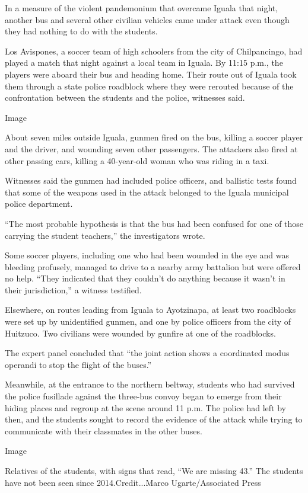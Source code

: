 In a measure of the violent pandemonium that overcame Iguala that night,
another bus and several other civilian vehicles came under attack even
though they had nothing to do with the students.

Los Avispones, a soccer team of high schoolers from the city of
Chilpancingo, had played a match that night against a local team in
Iguala. By 11:15 p.m., the players were aboard their bus and heading
home. Their route out of Iguala took them through a state police
roadblock where they were rerouted because of the confrontation between
the students and the police, witnesses said.

Image

About seven miles outside Iguala, gunmen fired on the bus, killing a
soccer player and the driver, and wounding seven other passengers. The
attackers also fired at other passing cars, killing a 40-year-old woman
who was riding in a taxi.

Witnesses said the gunmen had included police officers, and ballistic
tests found that some of the weapons used in the attack belonged to the
Iguala municipal police department.

``The most probable hypothesis is that the bus had been confused for one
of those carrying the student teachers,'' the investigators wrote.

Some soccer players, including one who had been wounded in the eye and
was bleeding profusely, managed to drive to a nearby army battalion but
were offered no help. ``They indicated that they couldn't do anything
because it wasn't in their jurisdiction,'' a witness testified.

Elsewhere, on routes leading from Iguala to Ayotzinapa, at least two
roadblocks were set up by unidentified gunmen, and one by police
officers from the city of Huitzuco. Two civilians were wounded by
gunfire at one of the roadblocks.

The expert panel concluded that ``the joint action shows a coordinated
modus operandi to stop the flight of the buses.''

Meanwhile, at the entrance to the northern beltway, students who had
survived the police fusillade against the three-bus convoy began to
emerge from their hiding places and regroup at the scene around 11 p.m.
The police had left by then, and the students sought to record the
evidence of the attack while trying to communicate with their classmates
in the other buses.

Image

Relatives of the students, with signs that read, ``We are missing 43.''
The students have not been seen since 2014.Credit...Marco
Ugarte/Associated Press

